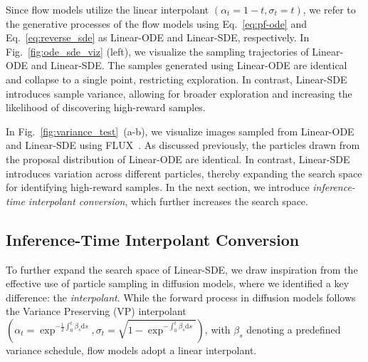 Since flow models utilize the linear interpolant $(\alpha_t = 1 - t, \sigma_t = t)$, we refer to the generative processes of the flow models using Eq.~\ref{eq:pf-ode} and Eq.~\ref{eq:reverse_sde} as Linear-ODE and Linear-SDE, respectively. 
In Fig.~\ref{fig:ode_sde_viz} (left), we visualize the sampling trajectories of Linear-ODE and Linear-SDE. 
The samples generated using Linear-ODE are identical and collapse to a single point, restricting exploration. 
In contrast, Linear-SDE introduces sample variance, allowing for broader exploration and increasing the likelihood of discovering high-reward samples. 

In Fig.~\ref{fig:variance_test}~(a-b), we visualize images sampled from Linear-ODE and Linear-SDE using FLUX~\cite{BlackForestLabs:2024Flux}. 
As discussed previously, the particles drawn from the proposal distribution of Linear-ODE are identical. In contrast, Linear-SDE introduces variation across different particles, thereby expanding the search space for identifying high-reward samples.
In the next section, we introduce \emph{inference-time interpolant conversion}, which further increases the search space.

          

\vspace{-0.4\baselineskip}
\subsection{Inference-Time Interpolant Conversion}
\vspace{-0.5\baselineskip}
\label{sec:scheduler_conversion} 
To further expand the search space of Linear-SDE, we draw inspiration from the effective use of particle sampling in diffusion models, where we identified a key difference: the \textit{interpolant}.
While the forward process in diffusion models follows the Variance Preserving (VP) interpolant $(\alpha_t = \exp^{-\frac{1}{2} \int_0^t \beta_s \mathrm{d}s}, \sigma_t = \sqrt{1 - \exp^{-\int_0^t \beta_s \mathrm{d}s}})$, with $\beta_s$ denoting a predefined variance schedule, flow models adopt a linear interpolant. 


